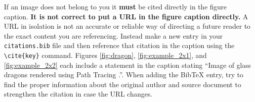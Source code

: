 		If an image does not belong to you it \textbf{must} be cited directly in the figure caption. \textbf{It is not correct to put a URL in the figure caption directly.} A URL in isolation is not an accurate or reliable way of directing a future reader to the exact content you are referencing. Instead make a new entry in your \lstinline|citations.bib| file and then reference that citation in the caption using the \lstinline|\cite{key}| command. Figures \ref{fig:dragon}, \ref{fig:example_2x1}, and \ref{fig:example_2x2} each include a statement in the caption stating ``Image of glass dragons rendered using Path Tracing \cite{whittle15_dragons}.''. When adding the BibTeX entry, try to find the proper information about the original author and source document to strengthen the citation in case the URL changes. 